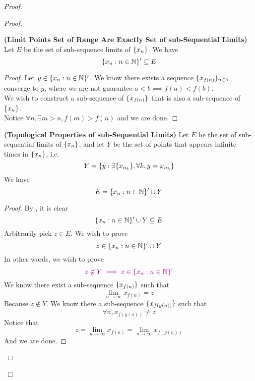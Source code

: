 \documentclass{report}
\begin{document}
\begin{proof}
\begin{proof}
{\begin{minipage}{39em}
\end{minipage}}
\begin{theorem}
\label{4.3.6}
\textbf{(Limit Points Set of Range Are Exactly Set of sub-Sequential Limits)} Let $E$ be the set of sub-sequence limits of  $\{ x_n \}$. We have
\begin{equation}
\{ x_n:n\in\mathbb{N} \}'\subseteq E
\end{equation}
\end{theorem}
\begin{proof}
Let $y\in \{ x_n:n\in\mathbb{N} \}'$. We know there exists a sequence $\{ x_{f(n)} \}_{n\in\mathbb{N}}$ converge to $y$, where we are not guarantee $a<b\implies f(a)<f(b)$.\\

We wish to construct a sub-sequence of $\{ x_{f(n)} \}$ that is also a sub-sequence of $\{ x_n \}$.\\

Notice  $\forall n, \exists m>n, f(m)>f(n)$ and we are done.
\end{proof}
\begin{theorem}
\label{4.3.7}
\textbf{(Topological Properties of sub-Sequential Limits)} Let $E$ be the set of sub-sequential limits of $\{ x_n \}$, and let $Y$ be the set of points that appears infinite times in  $\{ x_n \}$, i.e.
\begin{equation}
  Y=\{ y:\exists \{ x_{n_k} \},\forall k, y=x_{n_k} \}
\end{equation}
We have
\begin{equation}
E=\{ x_n:n\in\mathbb{N} \}' \cup Y
\end{equation}
\end{theorem}
\begin{proof}
By , it is clear 
\begin{equation}
\{ x_n:n\in\mathbb{N} \}' \cup Y\subseteq E
\end{equation}
Arbitrarily pick $z\in E$. We wish to prove
\begin{equation}
z\in \{ x_n:n\in\mathbb{N} \}'\cup Y
\end{equation}
In other words, we wish to prove
\begin{equation}
  \textcolor{violet}{z\not\in Y\implies z\in \{ x_n:n\in\mathbb{N} \}'}
\end{equation}
We know there exist a sub-sequence $\{ x_{f(n)} \}$ such that 
\begin{equation}
\lim_{n\to\infty}x_{f(n)}=z
\end{equation}
Because $z\not\in Y$. We know there a sub-sequence $\{ x_{f(g(n))} \}$ such that
\begin{equation}
\forall n,x_{f(g(n))}\neq z
\end{equation}
Notice that
 \begin{equation}
z=\lim_{n\to\infty}x_{f(n)}=\lim_{n\to\infty}x_{f(g(n))} 
\end{equation}
And we are done.
\end{proof}
\fbox{\begin{minipage}{39em}


\end{minipage}}
\end{proof}
\end{proof}
\end{document}

